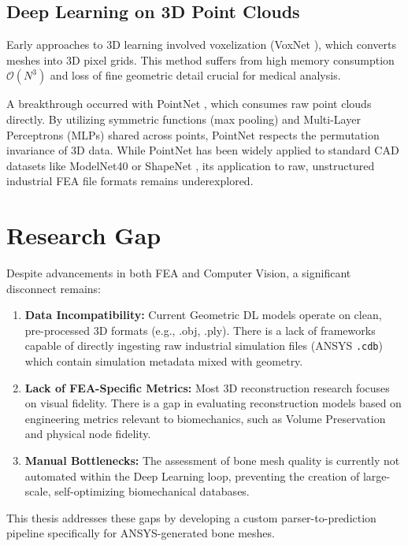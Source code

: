 \documentclass[conference]{IEEEtran}
\begin{document}
\subsection{Deep Learning on 3D Point Clouds}
Early approaches to 3D learning involved voxelization (VoxNet \cite{voxnet}), which converts meshes into 3D pixel grids. This method suffers from high memory consumption $\mathcal{O}(N^3)$ and loss of fine geometric detail crucial for medical analysis. 

A breakthrough occurred with PointNet \cite{pointnet}, which consumes raw point clouds directly. By utilizing symmetric functions (max pooling) and Multi-Layer Perceptrons (MLPs) shared across points, PointNet respects the permutation invariance of 3D data. While PointNet has been widely applied to standard CAD datasets like ModelNet40 or ShapeNet \cite{shapenet}, its application to raw, unstructured industrial FEA file formats remains underexplored.

\section{Research Gap}
Despite advancements in both FEA and Computer Vision, a significant disconnect remains:
\begin{enumerate}
    \item \textbf{Data Incompatibility:} Current Geometric DL models operate on clean, pre-processed 3D formats (e.g., .obj, .ply). There is a lack of frameworks capable of directly ingesting raw industrial simulation files (ANSYS \texttt{.cdb}) which contain simulation metadata mixed with geometry.
    \item \textbf{Lack of FEA-Specific Metrics:} Most 3D reconstruction research focuses on visual fidelity. There is a gap in evaluating reconstruction models based on engineering metrics relevant to biomechanics, such as Volume Preservation and physical node fidelity.
    \item \textbf{Manual Bottlenecks:} The assessment of bone mesh quality is currently not automated within the Deep Learning loop, preventing the creation of large-scale, self-optimizing biomechanical databases.
\end{enumerate}

This thesis addresses these gaps by developing a custom parser-to-prediction pipeline specifically for ANSYS-generated bone meshes.
\end{document}
